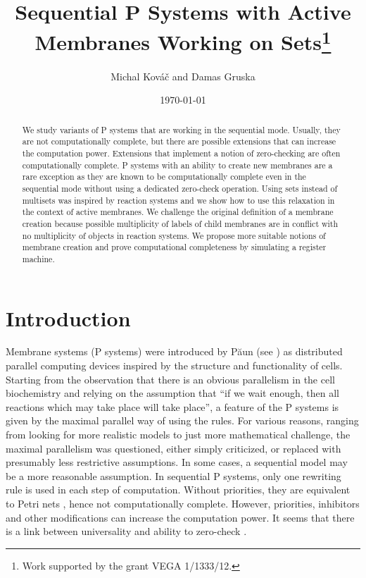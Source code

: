 \documentclass[submission,copyright,creativecommons]{../lib/lncs/llncs}
\begin{document}
\title{Sequential P Systems with Active Membranes Working on Sets\thanks{Work supported by the grant VEGA 1/1333/12.}}
\author{Michal Kováč and Damas Gruska}
\date{\today}
\maketitle

\begin{abstract}
We study variants of P systems that are working in the sequential mode. Usually, they are not computationally complete, but there are possible extensions that can increase the computation power. Extensions that implement a notion of zero-checking are often computationally complete.
P systems with an ability to create new membranes are a rare exception as they are known to be computationally complete even in the sequential mode without using a dedicated zero-check operation. Using sets instead of multisets was inspired by reaction systems and we show how to use this relaxation in the context of active membranes. We challenge the original definition of a membrane creation because possible multiplicity of labels of child membranes are in conflict with no multiplicity of objects in reaction systems. We propose more suitable notions of membrane creation and prove computational completeness by simulating a register machine.
\end{abstract}

\section{Introduction}
\label{sec:introduction}


Membrane systems (P systems) \cite{Paun10OxfordHandbookMembraneComputing} were introduced by P\u{a}un (see \cite{Paun2000108}) as distributed parallel computing devices inspired by the structure and functionality of cells. Starting from the observation that there is an obvious parallelism in the cell biochemistry and relying on the assumption that ``if we wait enough, then all reactions which may take place will take place'', a feature of the P systems is given by the maximal parallel way of using the rules. For various reasons, ranging from looking for more realistic models to just more mathematical challenge, the maximal parallelism was questioned, either simply criticized, or replaced with presumably less restrictive assumptions.
In some cases, a sequential model may be a more reasonable assumption. In sequential P systems, only one rewriting rule is used in each step of computation. Without priorities, they are equivalent to Petri nets \cite{Ibarra05Active}, hence not computationally complete. However, priorities, inhibitors and other modifications can increase the computation power. It seems that there is a link between universality and ability to zero-check \cite{Alhazov12Properties}.
\end{document}
